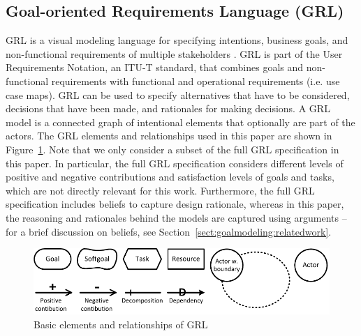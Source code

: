 \subsection{Goal-oriented Requirements Language (GRL)}
\label{sect:background:grl}
GRL is a visual modeling language for specifying intentions, business goals, and non-functional requirements of multiple stakeholders \cite{Amyot:2010:EGM:1841349.1841356}. GRL is part of the User Requirements Notation, an ITU-T standard, that combines goals and non-functional requirements with functional and operational requirements (i.e. use case maps). GRL can be used to specify alternatives that have to be considered, decisions that have been made, and rationales for making decisions. A GRL model is a connected graph of intentional elements that optionally are part of the actors. The GRL elements and relationships used in this paper are shown in Figure~\ref{fig:grl_legend}. Note that we only consider a subset of the full GRL specification in this paper. In particular, the full GRL specification considers different levels of positive and negative contributions and satisfaction levels of goals and tasks, which are not directly relevant for this work. Furthermore, the full GRL specification includes beliefs to capture design rationale, whereas in this paper, the reasoning and rationales behind the models are captured using arguments -- for a brief discussion on beliefs, see Section~\ref{sect:goalmodeling:relatedwork}. 

\begin{figure}[ht]
\centering
\includegraphics{img/grl_legend.pdf}
\caption{Basic elements and relationships of GRL}
\label{fig:grl_legend}
\end{figure}



